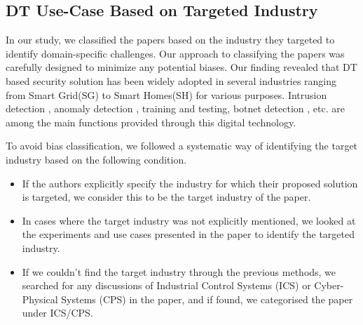 




\subsection{DT Use-Case Based on Targeted Industry}
In our study, we classified the papers based on the industry they targeted to identify domain-specific challenges. Our approach to classifying the papers was carefully designed to minimize any potential biases. Our finding revealed that DT based security solution has been widely adopted in several industries ranging from Smart Grid(SG) to Smart Homes(SH) for various purposes. Intrusion detection \cite{akbarianIntrusionDetectionDigital2020}, anomaly detection \cite{sugumarAssessmentMethodDetecting2019}, training and testing\cite{rebecchiDigitalTwin5G2022, becueCyberFactorySecuringIndustry40with2018}, botnet detection \cite{salimBlockchainEnabledSecureDigital2022}, etc. are among the main functions provided through this digital technology. 


To avoid bias classification, we followed a systematic way of identifying the target industry based on the following condition. 

\begin{itemize}
    \item If the authors explicitly specify the industry for which their proposed solution is targeted, we consider this to be the target industry of the paper.
    \item In cases where the target industry was not explicitly mentioned, we looked at the experiments and use cases presented in the paper to identify the targeted industry.
    \item If we couldn't find the target industry through the previous methods, we searched for any discussions of Industrial Control Systems (ICS) or Cyber-Physical Systems (CPS) in the paper, and if found, we categorised the paper under ICS/CPS.
\end{itemize}


